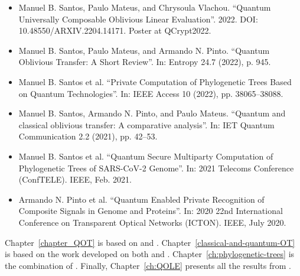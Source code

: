 \begin{itemize}
	\item\cite{SMV22} Manuel B. Santos, Paulo Mateus, and Chrysoula Vlachou. “Quantum Universally
Composable Oblivious Linear Evaluation”. 2022. DOI: 10.48550/ARXIV.2204.14171. Poster at QCrypt2022.	
	
	\item\cite{SMP22} Manuel B. Santos, Paulo Mateus, and Armando N. Pinto. “Quantum Oblivious Transfer:
A Short Review”. In: Entropy 24.7 (2022), p. 945.

	\item\cite{SGPM22} Manuel B. Santos et al. “Private Computation of Phylogenetic Trees Based on Quantum
Technologies”. In: IEEE Access 10 (2022), pp. 38065–38088.

	\item\cite{SPM21} Manuel B. Santos, Armando N. Pinto, and Paulo Mateus. “Quantum and classical
oblivious transfer: A comparative analysis”. In: IET Quantum Communication 2.2 (2021), pp. 42–53.

	\item\cite{SGPM21} Manuel B. Santos et al. “Quantum Secure Multiparty Computation of Phylogenetic Trees of SARS-CoV-2 Genome”. In: 2021 Telecoms Conference (ConfTELE). IEEE, Feb. 2021.

    \item\cite{POS+20} Armando N. Pinto et al. “Quantum Enabled Private Recognition of Composite Signals
in Genome and Proteins”. In: 2020 22nd International Conference on Transparent Optical
Networks (ICTON). IEEE, July 2020. 
\end{itemize}

Chapter~\ref{chapter_QOT} is based on \cite{SMP22} and \cite{SGPM22}. Chapter~\ref{classical-and-quantum-OT} is based on the work developed on both \cite{SPM21} and \cite{SGPM22}. Chapter~\ref{ch:phylogenetic-trees} is the combination of \cite{SGPM22, SGPM21, POS+20}. Finally, Chapter~\ref{ch:QOLE} presents all the results from \cite{SMV22}. 







